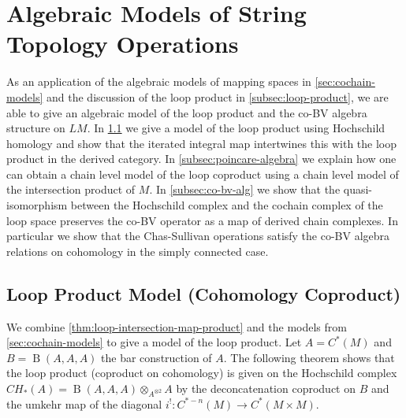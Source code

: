 \documentclass{scrartcl}
\theoremstyle{plain}
\theoremstyle{definition}
\DeclareMathOperator{\BC}{B}
\begin{document}
\section{Algebraic Models of String Topology Operations}\label{sec:loop-models}
As an application of the algebraic models of mapping spaces in \cref{sec:cochain-models} and the discussion of the loop product in \cref{subsec:loop-product}, we are able to give an algebraic model of the loop product and the co-BV algebra structure on $LM$. In \cref{subsec:loop-product-model} we give a model of the loop product using Hochschild homology and show that the iterated integral map intertwines this with the loop product in the derived category. In \cref{subsec:poincare-algebra} we explain how one can obtain a chain level model of the loop coproduct using a chain level model of the intersection product of $M$. In \cref{subsec:co-bv-alg} we show that the quasi-isomorphism between the Hochschild complex and the cochain complex of the loop space preserves the co-BV operator as a map of derived chain complexes. In particular we show that the Chas-Sullivan operations satisfy the co-BV algebra relations on cohomology in the simply connected case. 

\subsection{Loop Product Model (Cohomology Coproduct)}\label{subsec:loop-product-model}
We combine \cref{thm:loop-intersection-map-product} and the models from \cref{sec:cochain-models} to give a model of the loop product. Let $A = C^*(M)$ and $B=\BC(A, A, A)$ the bar construction of $A$. The following theorem shows that the loop product (coproduct on cohomology) is given on the Hochschild complex $CH_*(A) = \BC(A, A, A) \otimes_{A^{\otimes 2}} A$ by the deconcatenation coproduct on $B$ and the umkehr map of the diagonal $i^!\colon C^{*-n}(M)\to C^*(M\times M)$. 
\end{document}

